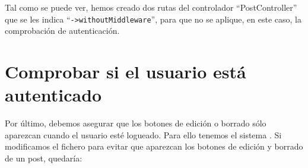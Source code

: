 Tal como se puede ver, hemos creado dos rutas del controlador “PostController” que se les indica “\texttt{->withoutMiddleware}”, para que no se aplique, en este caso, la comprobación de autenticación.


\chapter{Comprobar si el usuario está autenticado}

Por último, debemos asegurar que los botones de edición o borrado sólo aparezcan cuando el usuario esté logueado. Para ello tenemos el sistema . Si modificamos el fichero  para evitar que aparezcan los botones de edición y borrado de un post, quedaría:

